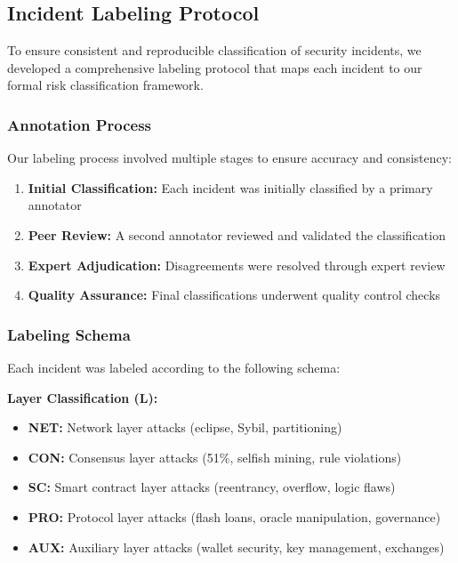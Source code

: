 \subsection{Incident Labeling Protocol}
\label{sec:labeling_protocol}

To ensure consistent and reproducible classification of security incidents, we developed a comprehensive labeling protocol that maps each incident to our formal risk classification framework.

\subsubsection{Annotation Process}
Our labeling process involved multiple stages to ensure accuracy and consistency:

\begin{enumerate}
    \item \textbf{Initial Classification:} Each incident was initially classified by a primary annotator
    \item \textbf{Peer Review:} A second annotator reviewed and validated the classification
    \item \textbf{Expert Adjudication:} Disagreements were resolved through expert review
    \item \textbf{Quality Assurance:} Final classifications underwent quality control checks
\end{enumerate}

\subsubsection{Labeling Schema}
Each incident was labeled according to the following schema:

\textbf{Layer Classification (L):}
\begin{itemize}
    \item \textbf{NET:} Network layer attacks (eclipse, Sybil, partitioning)
    \item \textbf{CON:} Consensus layer attacks (51\%, selfish mining, rule violations)
    \item \textbf{SC:} Smart contract layer attacks (reentrancy, overflow, logic flaws)
    \item \textbf{PRO:} Protocol layer attacks (flash loans, oracle manipulation, governance)
    \item \textbf{AUX:} Auxiliary layer attacks (wallet security, key management, exchanges)
\end{itemize}

